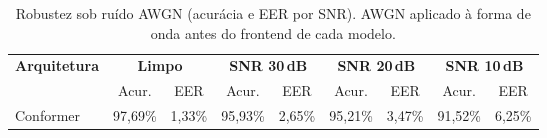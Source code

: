 \begin{table}[H]
\centering
\caption{Robustez sob ruído AWGN (acurácia e EER por SNR). AWGN aplicado à forma de onda antes do frontend de cada modelo.}
\label{tab:bench_robustez}
\small\singlespacing
\begin{tabular}{lcccccccc}
\toprule
\multirow{2}{*}{\textbf{Arquitetura}} & \multicolumn{2}{c}{\textbf{Limpo}} & \multicolumn{2}{c}{\textbf{SNR 30\,dB}} & \multicolumn{2}{c}{\textbf{SNR 20\,dB}} & \multicolumn{2}{c}{\textbf{SNR 10\,dB}} \\
\cmidrule(lr){2-3}\cmidrule(lr){4-5}\cmidrule(lr){6-7}\cmidrule(lr){8-9}
 & Acur. & EER & Acur. & EER & Acur. & EER & Acur. & EER \\
\midrule
Conformer & 97,69\% & 1,33\% & 95,93\% & 2,65\% & 95,21\% & 3,47\% & 91,52\% & 6,25\% \\
\bottomrule
\end{tabular}
\end{table}
